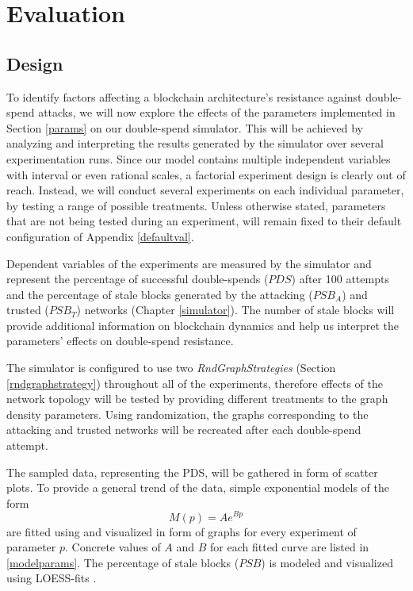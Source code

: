 \documentclass[a4paper,12pt,twoside]{report}
\begin{document}
\chapter{Evaluation} \label{eval}

\section{Design} \label{design}
To identify factors affecting a blockchain architecture's resistance against double-spend attacks, we will now explore the effects of the parameters implemented in Section \ref{params} on our double-spend simulator. This will be achieved by analyzing and interpreting the results generated by the simulator over several experimentation runs. Since our model contains multiple independent variables with interval or even rational scales, a factorial experiment design is clearly out of reach. Instead, we will conduct several experiments on each individual parameter, by testing a range of possible treatments. Unless otherwise stated, parameters that are not being tested during an experiment, will remain fixed to their default configuration of Appendix \ref{defaultval}. 

Dependent variables of the experiments are measured by the simulator and represent the percentage of successful double-spends ($PDS$) after 100 attempts and the percentage of stale blocks generated by the attacking ($PSB_{A}$) and trusted ($PSB_{T}$) networks (Chapter \ref{simulator}). The number of stale blocks will provide additional information on blockchain dynamics and help us interpret the parameters' effects on double-spend resistance. 

The simulator is configured to use two \textit{RndGraphStrategies} (Section \ref{rndgraphstrategy}) throughout all of the experiments, therefore effects of the network topology will be tested by providing different treatments to the graph density parameters. Using randomization, the graphs corresponding to the attacking and trusted networks will be recreated after each double-spend attempt. 

The sampled data, representing the PDS, will be gathered in form of scatter plots. To provide a general trend of the data, simple exponential models of the form
\begin{equation}\label{model}
M(p) = Ae^{Bp}
\end{equation}
are fitted using \cite{nlxb} and visualized in form of graphs for every experiment of parameter $p$. Concrete values of $A$ and $B$ for each fitted curve are listed in \autoref{modelparams}. The percentage of stale blocks ($PSB$) is modeled and visualized using LOESS-fits \cite{loess,r}. 
\end{document}
